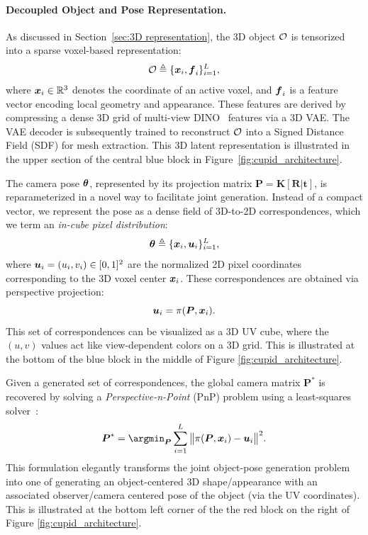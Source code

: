 \documentclass[../../book-main.tex]{subfiles}
\begin{document}
\paragraph{Decoupled Object and Pose Representation.}

As discussed in Section~\ref{sec:3D representation}, the 3D object
$\mathcal{O}$ is tensorized into a sparse voxel-based representation:
\begin{equation}
\mathcal{O} \triangleq \{\boldsymbol{x}_i, \boldsymbol{f}_i\}_{i=1}^{L},
\end{equation}
where $\boldsymbol{x}_i \in \mathbb{R}^3$ denotes the coordinate of an active
voxel, and $\boldsymbol{f}_i$ is a feature vector encoding local geometry and
appearance. These features are derived by compressing a dense 3D grid
of multi-view DINO~\citep{oquab2023dinov2} features via a 3D VAE. The
VAE decoder is subsequently trained to reconstruct $\mathcal{O}$ into a
Signed Distance Field (SDF) for mesh extraction. This 3D latent
representation is illustrated in the upper section of the central
blue block in Figure~\ref{fig:cupid_architecture}.

The camera pose $\boldsymbol{\theta}$, represented by its projection matrix
$\boldsymbol{P} = \boldsymbol{K}[\boldsymbol{R}|\boldsymbol{t}]$, is
reparameterized
in a novel way to facilitate joint generation. Instead of a compact
vector, we represent the pose as a dense field of 3D-to-2D
correspondences, which we term an \textit{in-cube pixel distribution}:
\[
\boldsymbol{\theta} \triangleq \{\boldsymbol{x}_i, \boldsymbol{u}_i\}_{i=1}^{L},
\]
where $\boldsymbol{u}_i = (u_i, v_i) \in [0,1]^2$ are the normalized 2D
pixel coordinates corresponding to the 3D voxel center $\boldsymbol{x}_i$.
These correspondences are obtained via perspective projection:
\[
\boldsymbol{u}_i = \pi(\boldsymbol{P}, \boldsymbol{x}_i).
\]
This set of correspondences can be visualized as a 3D UV cube, where
the $(u,v)$ values act like view-dependent colors on a 3D grid. This
is illustrated at the bottom of the blue block in the middle of
Figure \ref{fig:cupid_architecture}.

Given a generated set of correspondences, the global camera matrix
$\boldsymbol{P}^{*}$ is recovered by solving a {\em Perspective-n-Point}
(PnP) problem using a least-squares solver~\citep{abdel2015direct}:
\begin{equation}
\boldsymbol{P}^{*} = \argmin_{\boldsymbol{P}} \sum_{i=1}^{\numpts}
\big\|\pi(\boldsymbol{P},\point_i) - \pixcoord_i\big\|^2.
\label{eq:pnp}
\end{equation}
This formulation elegantly transforms the joint object-pose
generation problem into one of generating an object-centered 3D
shape/appearance with an associated observer/camera centered pose of
the object (via the UV coordinates). This is illustrated at the
bottom left corner of the the red block on the right of Figure
\ref{fig:cupid_architecture}.
\end{document}
